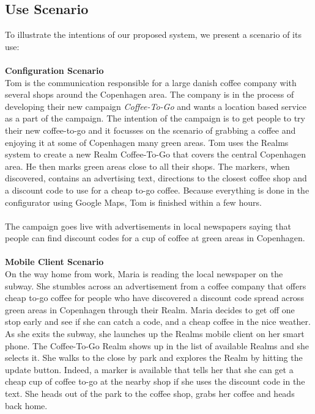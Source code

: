 \subsection{Use Scenario} %
\label{sub:scenario}
To illustrate the intentions of our proposed system, we present a scenario of its use:
\\\\
\textbf{Configuration Scenario}\\
Tom is the communication responsible for a large danish coffee company with several shops around the Copenhagen area. The company is in the process of developing their new campaign \emph{Coffee-To-Go} and wants a location based service as a part of the campaign. The intention of the campaign is to get people to try their new coffee-to-go and it focusses on the scenario of grabbing a coffee and enjoying it at some of Copenhagen many green areas. Tom uses the Realms system to create a new Realm Coffee-To-Go that covers the central Copenhagen area. He then marks green areas close to all their shops. The markers, when discovered, contains an advertising text, directions to the closest coffee shop and a discount code to use for a cheap to-go coffee. Because everything is done in the configurator using Google Maps, Tom is finished within a few hours.
\\\\
The campaign goes live with advertisements in local newspapers saying that people can find discount codes for a cup of coffee at green areas in Copenhagen. 
\\\\
\textbf{Mobile Client Scenario}\\
On the way home from work, Maria is reading the local newspaper on the subway. She stumbles across an advertisement from a coffee company that offers cheap to-go coffee for people who have discovered a discount code spread across green areas in Copenhagen through their Realm. Maria decides to get off one stop early and see if she can catch a code, and a cheap coffee in the nice weather. As she exits the subway, she launches up the Realms mobile client on her smart phone. The Coffee-To-Go Realm shows up in the list of available Realms and she selects it. She walks to the close by park and explores the Realm by hitting the update button. Indeed, a marker is available that tells her that she can get a cheap cup of coffee to-go at the nearby shop if she uses the discount code in the text. She heads out of the park to the coffee shop, grabs her coffee and heads back home.


